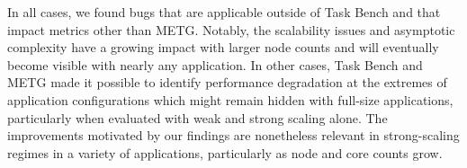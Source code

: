 {In all cases, we found bugs that are applicable outside of Task Bench
and that impact metrics other than METG. Notably, the scalability
issues and asymptotic complexity have a growing impact with larger
node counts and will eventually become visible with nearly any
application. In other cases, Task Bench and METG made it possible to
identify performance degradation at the extremes of application
configurations which might remain hidden with full-size applications,
particularly when evaluated with weak and strong scaling alone. The
improvements motivated by our findings are nonetheless relevant in
strong-scaling regimes in a variety of applications, particularly as
node and core counts grow.

} %

